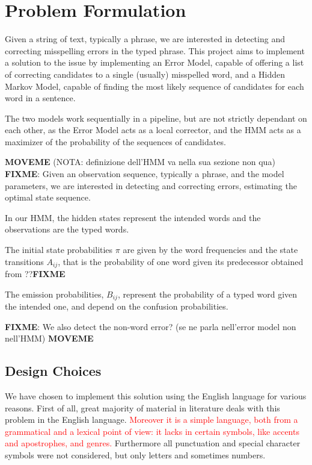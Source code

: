 \chapter{Problem Formulation}

Given a string of text, typically a phrase, we are interested in detecting and correcting misspelling errors in the typed phrase.
This project aims to implement a solution to the issue by implementing an Error Model, capable of offering a list of correcting candidates to a single (usually) 
misspelled word, and a Hidden Markov Model, capable of finding the most likely sequence of candidates for each word in a sentence.

The two models work sequentially in a pipeline, but are not strictly dependant on each other, as the Error Model acts as a local corrector, and the HMM acts as 
a maximizer of the probability of the sequences of candidates.


\textbf{MOVEME} (NOTA: definizione dell'HMM va nella sua sezione non qua)
\textbf{FIXME}: Given an observation sequence, typically a phrase, and the model parameters, we are interested 
in detecting and correcting errors, estimating the optimal state sequence. 

In our HMM, the hidden states represent the intended words and the observations are the typed words. 

The initial state probabilities $\pi$ are given by the word frequencies and the state transitions $A_{ij}$, that is 
the probability of one word given its predecessor obtained from ??\textbf{FIXME}

The emission probabilities, $B_{ij}$, represent the probability of a typed word given the intended one, and 
depend on the confusion probabilities.

\textbf{FIXME}: We also detect the non-word error? (se ne parla nell'error model non nell'HMM)
\textbf{MOVEME}

\section{Design Choices}

We have chosen to implement this solution using the English language for various reasons. First of all, great majority of material in literature 
deals with this problem in the English language. \textcolor{red}{Moreover it is a simple language, both from a 
	grammatical and a lexical point of view: it lacks in certain symbols, like accents and apostrophes, and genres. }
Furthermore all punctuation and special character symbols were not considered, but only letters and sometimes 
numbers. 


